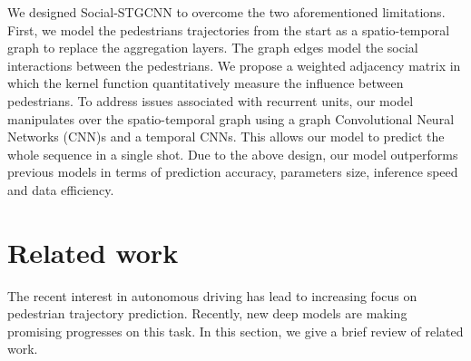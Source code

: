 \documentclass[10pt,twocolumn,letterpaper]{article}
\newcommand*{\ours}{Social-STGCNN }
\begin{document}
We designed \ours to overcome the two aforementioned limitations. First, we model the pedestrians trajectories from the start as a spatio-temporal graph to replace the aggregation layers. The graph edges model the social interactions between the pedestrians. We propose a weighted adjacency matrix in which the kernel function quantitatively measure the influence between pedestrians. To address issues associated with recurrent units, our model manipulates over the spatio-temporal graph using a graph Convolutional Neural Networks (CNN)s and a temporal CNNs. This allows our model to predict the whole sequence in a single shot. Due to the above design, our model outperforms previous models in terms of prediction accuracy, parameters size, inference speed and data efficiency.



\section{Related work}
\label{sec:background}
The recent interest in autonomous driving has lead to increasing focus on pedestrian trajectory prediction. Recently, new deep models are making promising progresses on this task. In this section, we give a brief review of related work.
\end{document}
